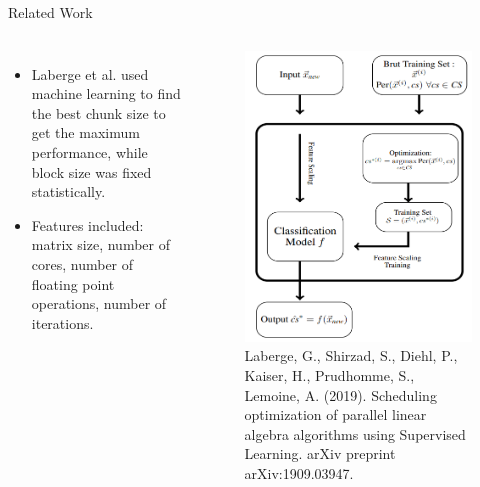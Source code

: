 \documentclass[10pt]{beamer}
\begin{document}
\begin{frame}{Related Work}
	\begin{outline}	
		\begin{columns}		
			\begin{itemize}
\item{Laberge et al. used machine learning to find the best chunk size to get the maximum performance, while block size was fixed statistically.}
\item{Features included: matrix size, number of cores, number of floating point operations, number of iterations.} 
\end{itemize}
		 \begin{figure}[]
		\includegraphics[scale=.22]{images/gab.png}\caption{Laberge, G., Shirzad, S., Diehl, P., Kaiser, H., Prudhomme, S.,  Lemoine, A. (2019). Scheduling optimization of parallel linear algebra algorithms using Supervised Learning. arXiv preprint arXiv:1909.03947.}\label{fig30}
		\end{figure}
			\end{columns}	
			
	\end{outline}
\end{frame}
\end{document}
